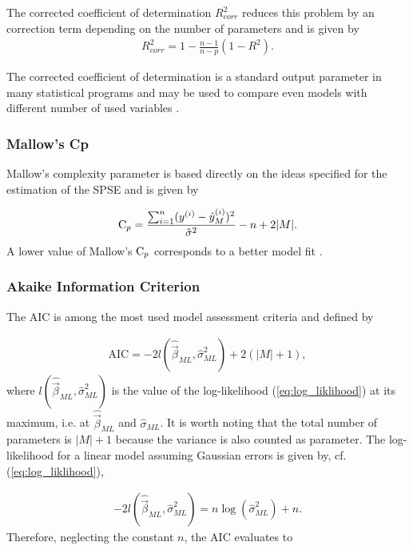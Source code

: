 \documentclass[10pt,a4paper]{report}
\begin{document}
The corrected coefficient of determination $R_{corr}^2$ reduces this problem by an correction term depending on the  number of parameters and is given by
\begin{align}
	R_{corr}^2 = 1 - \frac{n-1}{n-p}(1-R^2).
\end{align}

The corrected coefficient of determination is a standard output parameter in many statistical programs and may be used to compare even models with different number of used variables \cite{fahrmeir2007regression}.

\subsubsection{Mallow's Cp}

Mallow's complexity parameter is based directly on the ideas specified for the estimation of the SPSE and is given by

\begin{align}
	\text C_p = \frac{\sum_{i=1}^n (y^{(i)} - \hat y^{(i)}_M)^2}{\hat \sigma^2} - n + 2 \vert M \vert.
\end{align}
%
A lower value of Mallow's $\text C_p$ corresponds to a better model fit \cite{fahrmeir2007regression}.

\subsubsection{Akaike Information Criterion}

The AIC is among the most used model assessment criteria and defined by

\begin{align}
	\text{AIC} = -2 l(\hat{\vec{\beta}}_{ML}, \hat \sigma^2_{ML}) + 2(\vert M \vert +1),
\end{align}
%
where $l(\hat{\vec{\beta}}_{ML}, \hat \sigma^2_{ML})$ is the value of the log-likelihood (\ref{eq:log_liklihood}) at its maximum, i.e. at $\hat{\vec{\beta}}_{ML}$ and $\hat{\sigma}_{ML}$. It is worth noting that the total number of parameters is $\vert M \vert + 1$ because the variance is also counted as parameter. The log-likelihood for a linear model assuming Gaussian errors is given by, cf. (\ref{eq:log_liklihood}),

\begin{align}
	-2l(\hat{\vec{\beta}}_{ML}, \hat \sigma_{ML}^2) = n \log(\hat \sigma_{ML}^2) + n.
\end{align}
%
Therefore, neglecting the constant $n$, the AIC evaluates to
\end{document}
